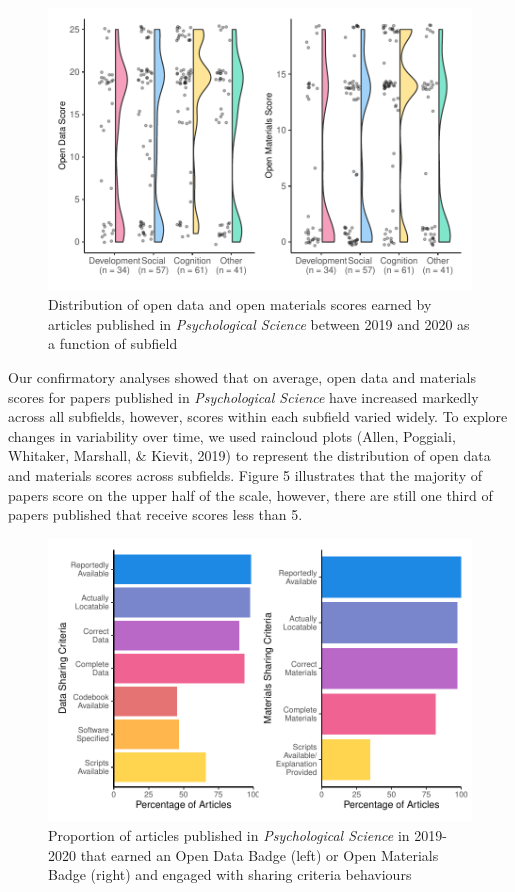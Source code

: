 \documentclass[
  english,
  man,floatsintext]{apa6}
\begin{document}
\begin{figure}
\centering
\includegraphics{icd_special_issue_files/figure-latex/rain-1.pdf}
\caption{\label{fig:rain}Distribution of open data and open materials scores earned by articles published in \emph{Psychological Science} between 2019 and 2020 as a function of subfield}
\end{figure}

Our confirmatory analyses showed that on average, open data and materials scores for papers published in \emph{Psychological Science} have increased markedly across all subfields, however, scores within each subfield varied widely. To explore changes in variability over time, we used raincloud plots (Allen, Poggiali, Whitaker, Marshall, \& Kievit, 2019) to represent the distribution of open data and materials scores across subfields. Figure 5 illustrates that the majority of papers score on the upper half of the scale, however, there are still one third of papers published that receive scores less than 5.

\begin{figure}
\centering
\includegraphics{icd_special_issue_files/figure-latex/unnamed-chunk-6-1.pdf}
\caption{\label{fig:unnamed-chunk-6}Proportion of articles published in \emph{Psychological Science} in 2019-2020 that earned an Open Data Badge (left) or Open Materials Badge (right) and engaged with sharing criteria behaviours}
\end{figure}
\end{document}
